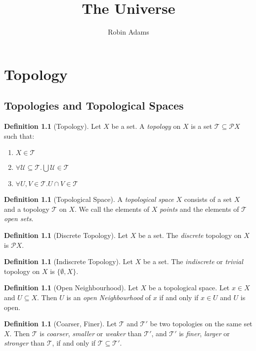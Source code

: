 \documentclass{book}
\title{The Universe}
\author{Robin Adams}
\theoremstyle{definition}
\newtheorem{definition}[lemma]{Definition}
\newcommand{\PP}{\ensuremath{\mathcal{P}}}
\newcommand{\TT}{\ensuremath{\mathcal{T}}}
\newcommand{\pow}[1]{\ensuremath{\PP {#1}}}
\begin{document}
\maketitle
\tableofcontents

\chapter{Topology}

\section{Topologies and Topological Spaces}

\begin{definition}[Topology]
    Let $X$ be a set. A \emph{topology} on $X$ is a set $\TT \subseteq \pow{X}$
    such that:
    \begin{enumerate}
        \item $X \in \TT$
        \item $\forall \mathcal{U} \subseteq \TT. \bigcup \mathcal{U} \in \TT$
        \item $\forall U,V \in \TT. U \cap V \in \TT$
    \end{enumerate}
\end{definition}

\begin{definition}[Topological Space]
    A \emph{topological space} $X$ consists of a set $X$ and a topology $\TT$ on $X$.
    We call the elements of $X$ \emph{points} and the elements of $\TT$ \emph{open sets}.
\end{definition}

\begin{definition}[Discrete Topology]
    Let $X$ be a set. The \emph{discrete} topology on $X$ is $\pow{X}$.
\end{definition}

\begin{definition}[Indiscrete Topology]
    Let $X$ be a set. The \emph{indiscrete} or \emph{trivial} topology on $X$ is $\{ \emptyset, X \}$.
\end{definition}

\begin{definition}[Open Neighbourhood]
    Let $X$ be a topological space. Let $x \in X$ and $U \subseteq X$. Then $U$ is an \emph{open Neighbourhood}
    of $x$ if and only if $x \in U$ and $U$ is open.
\end{definition}

\begin{definition}[Coarser, Finer]
    Let $\TT$ and $\TT'$ be two topologies on the same set $X$. Then $\TT$ is \emph{coarser}, \emph{smaller} or \emph{weaker} than $\TT'$,
    and $\TT'$ is \emph{finer}, \emph{larger} or \emph{stronger} than $\TT$, if and only if $\TT \subseteq \TT'$.
\end{definition}
\end{document}
